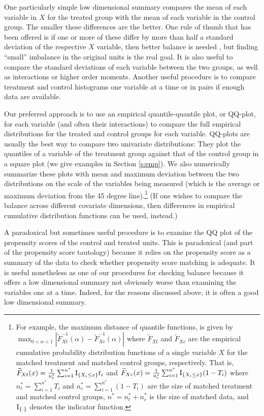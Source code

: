 \documentclass[11pt,titlepage]{article}
\begin{document}
One particularly simple low dimensional summary compares the mean of
each variable in $X$ for the treated group with the mean of each
variable in the control group.  The smaller these differences are the
better.  One rule of thumb that has been offered is if one or more of
these differ by more than half a standard deviation of the respective
$X$ variable, then better balance is needed \citep{Cochran68}, but
finding ``small'' imbalance in the original units is the real goal.
It is also useful to compare the standard deviations of each variable
between the two groups, as well as interactions or higher order
moments.  Another useful procedure is to compare treatment and control
histograms one variable at a time or in pairs if enough data are
available.

Our preferred approach is to use an empirical quantile-quantile plot,
or QQ-plot, for each variable (and often their interactions) to
compare the full empirical distributions for the treated and control
groups for each variable.  QQ-plots are usually the best way to
compare two univariate distributions: They plot the quantiles of a
variable of the treatment group against that of the control group in a
square plot (we give examples in Section \ref{s:emp}).  We also
numerically summarize these plots with mean and maximum deviation
between the two distributions on the scale of the variables being
measured (which is the average or maximum deviation from the 45 degree
line).\footnote{For example, the maximum distance of quantile
  functions, is given by $\max_{0 < \alpha < 1}
  |\widetilde{F}_{Xt}^{-1}(\alpha)-\widetilde{F}^{-1}_{Xc}(\alpha)|$
  where $\widetilde{F}_{Xt}$ and $\widetilde{F}_{Xc}$ are the
  empirical cumulative probability distribution functions of a single
  variable $X$ for the matched treatment and matched control groups,
  respectively. That is, $\widetilde{F}_{Xt}(x)=\frac{1}{n^*_t}
  \sum_{i=1}^{n^*} {\rm I}_{\{X_i \le x\}} t_i$ and
  $\widetilde{F}_{Xc}(x)=\frac{1}{n^*_c} \sum_{i=1}^{n^*} {\rm
    I}_{\{X_i \le x\}} (1-T_i)$ where $n^*_t=\sum_{i=1}^{n^*} T_i$ and
  $n^*_c=\sum_{i=1}^{n^*} (1-T_i)$ are the size of matched treatment
  and matched control groups, $n^*=n^*_t + n^*_c$ is the size of
  matched data, and ${\rm I}_{\{\cdot\}}$ denotes the indicator
  function.} (If one wishes to compare the balance across different
covariate dimensions, then differences in empirical cumulative
distribution functions can be used, instead.)

A paradoxical but sometimes useful procedure is to examine the QQ plot
of the propensity scores of the control and treated units.  This is
paradoxical (and part of the propensity score tautology) because it
relies on the propensity score as a summary of the data to check
whether propensity score matching is adequate.  It is useful
nonetheless as one of our procedures for checking balance because it
offers a low dimensional summary not obviously worse than 
examining the variables one at a time.  Indeed, for the reasons discussed
above, it is often a good low dimensional summary.
\end{document}
